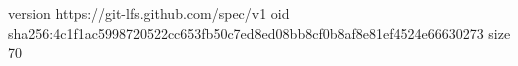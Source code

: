 version https://git-lfs.github.com/spec/v1
oid sha256:4c1f1ac5998720522cc653fb50c7ed8ed08bb8cf0b8af8e81ef4524e66630273
size 70
